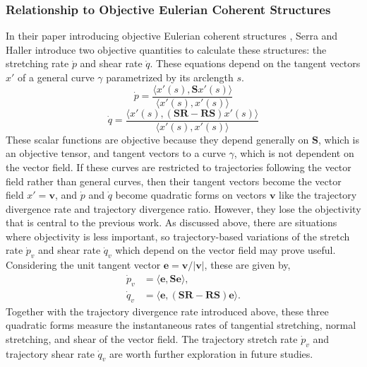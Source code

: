 \documentclass[twocolumn]{svjour3}
\begin{document}
\subsubsection{Relationship to Objective Eulerian Coherent Structures}
In their paper introducing objective Eulerian coherent structures \cite{serra_objective_2016}, Serra and Haller introduce two objective quantities to calculate these structures: the stretching rate $\dot{p}$ and shear rate $\dot{q}$. These equations depend on the tangent vectors $x'$ of a general curve $\gamma$ parametrized by its arclength $s$.
\begin{equation}\label{eq:stretch-rate}
\dot{p} = \frac{\langle x'(s),\mathbf{S}x'(s)\rangle}{\langle x'(s),x'(s)\rangle}
\end{equation}
\begin{equation}\label{eq:shear-rate}
\dot{q} = \frac{\langle x'(s),\left(\mathbf{S}\mathbf{R}-\mathbf{R}\mathbf{S}\right)x'(s)\rangle}{\langle x'(s),x'(s)\rangle}
\end{equation}
These scalar functions are objective because they depend generally on $\mathbf{S}$, which is an objective tensor, and tangent vectors to a curve $\gamma$, which is not dependent on the vector field. If these curves are restricted to trajectories following the vector field rather than general curves, then their tangent vectors become the vector field $x'=\mathbf{v}$, and $\dot{p}$ and $\dot{q}$ become quadratic forms on vectors $\mathbf{v}$ like the trajectory divergence rate and trajectory divergence ratio. However, they lose the objectivity that is central to the previous work. As discussed above, there are situations where objectivity is less important, so trajectory-based variations of the stretch rate $\dot{p}_v$ and shear rate $\dot{q}_v$ which depend on the vector field may prove useful. Considering the unit tangent vector $\mathbf{e}=\mathbf{v}/\left|\mathbf{v}\right|$, these are given by,
\begin{equation}
\begin{aligned}
\dot{p}_v &= \langle\mathbf{e}, \mathbf{S}\mathbf{e}\rangle, \\
\dot{q}_v &= \langle\mathbf{e}, \left(\mathbf{S}\mathbf{R}-\mathbf{R}\mathbf{S}\right)\mathbf{e}\rangle.
\end{aligned}
\end{equation}
Together with the trajectory divergence rate introduced above, these three quadratic forms measure the instantaneous rates of tangential stretching, normal stretching, and shear of the vector field. The trajectory stretch rate $\dot{p}_v$ and trajectory shear rate $\dot{q}_v$ are worth further exploration in future studies.
\end{document}
